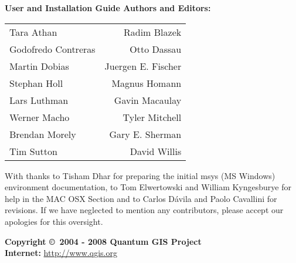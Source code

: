 \begin{flushleft}
\textbf{User and Installation Guide Authors and Editors:}
 
\begin{tabular}{l r}
Tara Athan
& Radim Blazek \\ 
Godofredo Contreras 
& Otto Dassau \\ 
Martin Dobias
& Juergen E. Fischer \\ 
Stephan Holl 
& Magnus Homann \\ 
Lars Luthman
& Gavin Macaulay \\
Werner Macho
& Tyler Mitchell \\ 
Brendan Morely 
& Gary E. Sherman \\ 
Tim Sutton
& David Willis \\
\end{tabular}

With thanks to Tisham Dhar for preparing the initial msys (MS Windows)
environment documentation, to Tom Elwertowski and William Kyngesburye for
help  in the MAC OSX Section and to Carlos D\'{a}vila and Paolo
Cavallini for revisions. If we have neglected to mention any contributors,
please accept our apologies for this oversight.

\textbf{Copyright \copyright~2004 - 2008 Quantum GIS Project} \\
\textbf{Internet:} \url{http://www.qgis.org}
\end{flushleft}

